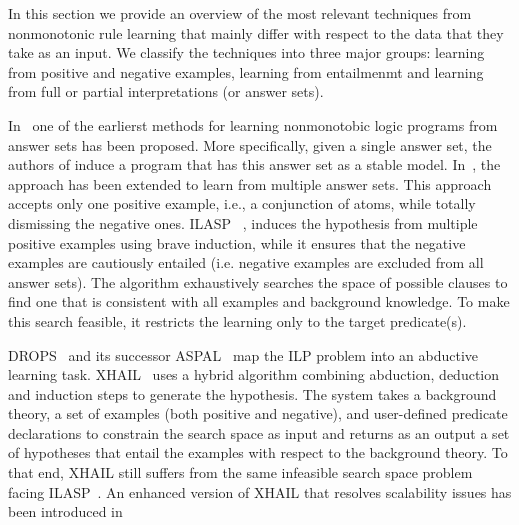 In this section we provide an overview of the most relevant techniques from nonmonotonic rule learning that mainly differ with respect to the data that they take as an input.
We classify the techniques into three major groups: learning from positive and negative examples, learning from entailmenmt and learning from full or partial interpretations (or answer sets).


In~\cite{DBLP:journals/tocl/Sakama05} %
one of the earlierst methods for learning nonmonotobic logic programs from answer sets has been proposed. %
More specifically, given a single answer set, the authors of \cite{DBLP:journals/tocl/Sakama05} induce a program that has this answer set as a stable model. In~\cite{Sakama2009}, the approach has been extended to learn from multiple answer sets. %
This approach accepts only one positive example, i.e.,  a conjunction of atoms, while totally dismissing the negative ones. ILASP ~\cite{ILASP_system}, induces the hypothesis from multiple positive examples using brave induction, while it ensures that the negative examples are cautiously entailed (i.e. negative examples are excluded from all answer sets). The algorithm exhaustively searches the space of possible clauses to find one that is consistent with all examples and background knowledge. To make this search feasible, it restricts the learning only to the target predicate(s). 


DROPS~\cite{CorapiRL10} and its successor ASPAL~\cite{ASPAL} map the ILP problem into an abductive learning task. %
XHAIL~\cite{XHAIL} uses a hybrid algorithm combining abduction, deduction and induction steps to generate the hypothesis. The system takes a background theory, a set of examples (both positive and negative), and user-defined predicate declarations to constrain the search space as input and returns as an output a set of hypotheses that entail the examples with respect to the background theory. To that end, XHAIL still suffers from the same infeasible search space problem facing ILASP~\cite{Sakama2009}. An enhanced version of XHAIL that resolves scalability issues has been introduced in~\cite{XHAIL_extended} 

